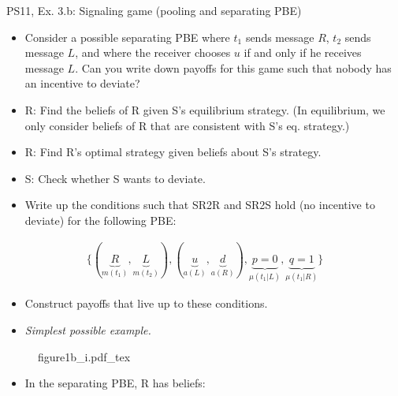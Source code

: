 \begin{frame}{PS11, Ex. 3.b: Signaling game (pooling and separating PBE)}
    \begin{itemize}
        \item[(b)] Consider a possible separating PBE where $t_1$ sends message $R$, $t_2$ sends message $L$, and where the receiver chooses $u$ if and only if he receives message $L$. Can you write down payoffs for this game such that nobody has an incentive to deviate?
    \end{itemize} \vspace{-8pt}
    \begin{multicols}{2}
      \begin{itemize}
        \item[SR3:] R: Find the beliefs of R given S's equilibrium strategy. (In equilibrium, we only consider beliefs of R that are consistent with S's eq. strategy.)
        \item[SR2R:] R: Find R's optimal strategy given beliefs about S's strategy.
        \item[SR2S:] S: Check whether S wants to deviate.
        \item[PBE:]  Write up the conditions such that SR2R and SR2S hold (no incentive to deviate) for the following PBE:
      \end{itemize}\vspace{-14pt}
      \begin{align*}
        \{(\underbrace{R}_{m(t_1)},\underbrace{L}_{m(t_2)}),(\underbrace{u}_{a(L)},\underbrace{d}_{a(R)}),\underbrace{p=0}_{\mu(t_1|L)},\underbrace{q=1}_{\mu(t_1|R)}\}
      \end{align*}\vspace{-12pt}
      \begin{itemize}
        \item[$\rightarrow$] Construct payoffs that live up to these conditions.
        \item[i:] \textit{Simplest possible example.}
      \end{itemize}
      \vfill\null\columnbreak
      \begin{figure}[!h]
        \center{}
        {figure1b_i.pdf_tex}
      \end{figure} \vspace{-8pt}
      \begin{itemize}
        \item[SR3:] In the separating PBE, R has beliefs:\vspace{-10pt}

\end{itemize}
\end{multicols}
\end{frame}
